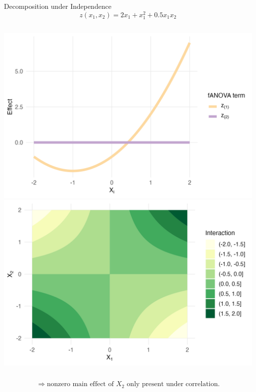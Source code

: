 \begin{frame}{Decomposition under Independence}
    \[
    z(x_1, x_2) = 2x_1 + x_1^2 + 0.5 x_1 x_2
    \]
  \begin{columns}
      \includegraphics[width=\linewidth]{../images/experiment_section/full_a1p20_a2p00_a11p10_a22p00_a12p05_rhop00_main.png}
      \includegraphics[width=\linewidth]{../images/experiment_section/full_a1p20_a2p00_a11p10_a22p00_a12p05_rhop00_interaction.png}
  \end{columns}
  \[
  \Rightarrow \text{nonzero main effect of } X_2 \text{ only present under correlation.}
  \]
\end{frame}




